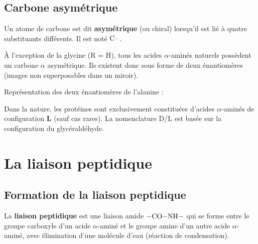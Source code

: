 \subsection{Carbone asymétrique}

\begin{definition}
Un atome de carbone est dit \textbf{asymétrique} (ou chiral) lorsqu'il est lié à quatre substituants différents. Il est noté $\ce{C*}$.
\end{definition}

\begin{propriete}
À l'exception de la glycine (R = H), tous les acides $\alpha$-aminés naturels possèdent un carbone $\alpha$ asymétrique. Ils existent donc sous forme de deux énantiomères (images non superposables dans un miroir).
\end{propriete}

\begin{illus}
Représentation des deux énantiomères de l'alanine :
\begin{center}
\qquad
{}
\end{center}
\end{illus}

\begin{remarque}
Dans la nature, les protéines sont exclusivement constituées d'acides $\alpha$-aminés de configuration \textbf{L} (sauf cas rares). La nomenclature D/L est basée sur la configuration du glycéraldéhyde.
\end{remarque}

\section{La liaison peptidique}

\subsection{Formation de la liaison peptidique}

\begin{definition}
La \textbf{liaison peptidique} est une liaison amide $\ce{-CO-NH-}$ qui se forme entre le groupe carboxyle d'un acide $\alpha$-aminé et le groupe amine d'un autre acide $\alpha$-aminé, avec élimination d'une molécule d'eau (réaction de condensation).
\end{definition}

